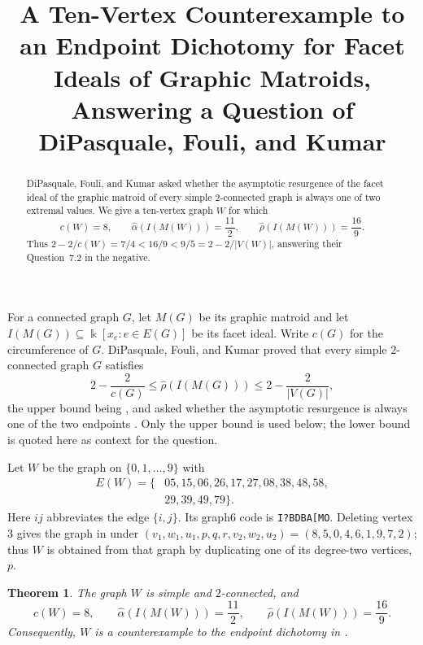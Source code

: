 \documentclass[11pt]{amsart}
\title[A ten-vertex counterexample]
{A Ten-Vertex Counterexample to an Endpoint Dichotomy for Facet Ideals
of Graphic Matroids, Answering a Question of DiPasquale, Fouli, and
Kumar}
\date{}
\newtheorem{theorem}{Theorem}
\theoremstyle{remark}
\newcommand{\ahat}{\widehat{\alpha}}
\newcommand{\rhat}{\widehat{\rho}}
\begin{document}
\begin{abstract}
DiPasquale, Fouli, and Kumar asked whether the asymptotic resurgence
of the facet ideal of the graphic matroid of every simple
$2$-connected graph is always one of two extremal values. We give a
ten-vertex graph $W$ for which
\[
c(W)=8,\qquad
\ahat(I(M(W)))=\frac{11}{2},\qquad
\rhat(I(M(W)))=\frac{16}{9}.
\]
Thus
$2-2/c(W)=7/4<16/9<9/5=2-2/|V(W)|$, answering their
Question~7.2 in the negative.
\end{abstract}

\maketitle

For a connected graph $G$, let $M(G)$ be its graphic matroid and let
$I(M(G))\subseteq \Bbbk[x_e:e\in E(G)]$ be its facet ideal. Write
$c(G)$ for the circumference of $G$. DiPasquale, Fouli, and Kumar
proved that every simple $2$-connected graph $G$ satisfies
\[
2-\frac{2}{c(G)}
\le \rhat(I(M(G)))
\le 2-\frac{2}{|V(G)|},
\]
the upper bound being \cite[Theorem~5.5]{DFK}, and asked whether the
asymptotic resurgence is always one of the two endpoints
\cite[Question~7.2]{DFK}. Only the upper bound is used below; the lower
bound is quoted here as context for the question.

Let $W$ be the graph on $\{0,1,\ldots,9\}$ with
\begin{equation}\label{eq:edges}
\begin{split}
E(W)=\{&05,15,06,26,17,27,08,38,48,58,\\
       &29,39,49,79\}.
\end{split}
\end{equation}
Here $ij$ abbreviates the edge $\{i,j\}$. Its graph6 code is
\texttt{I?BDBA[MO}. Deleting vertex $3$ gives the graph in
\cite[Example~6.1]{DFK} under
$(v_1,w_1,u_1,p,q,r,v_2,w_2,u_2)=(8,5,0,4,6,1,9,7,2)$; thus $W$
is obtained from that graph by duplicating one of its degree-two
vertices, $p$.

\begin{theorem}\label{thm:main}
The graph $W$ is simple and $2$-connected, and
\[
c(W)=8,\qquad
\ahat(I(M(W)))=\frac{11}{2},\qquad
\rhat(I(M(W)))=\frac{16}{9}.
\]
Consequently, $W$ is a counterexample to the endpoint dichotomy in
\cite[Question~7.2]{DFK}.
\end{theorem}
\end{document}
